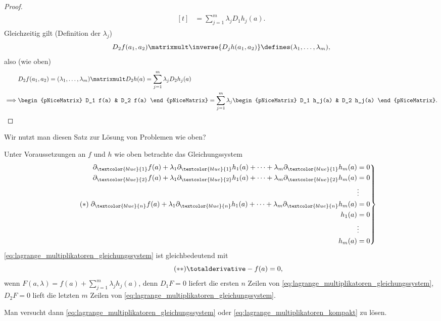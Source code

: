 \begin{proof}
\begin{align*}
\begin{aligned}[t]
      &=\sum_{j=1}^{m}\lambda_j D_1 h_j(a).
    \end{aligned}
  \end{align*}
  Gleichzeitig gilt (Definition der \( \lambda_j \))
  \begin{equation}
    D_2 f(a_1,a_2)\matrixmult\inverse{D_j h(a_1,a_2)}\defines (\lambda_1,\dotsc,\lambda_m),
  \end{equation}
  also (wie oben)
  \begin{align*}
    &D_2 f(a_1,a_2)=(\lambda_1,\dotsc,\lambda_m)\matrixmult D_2h(a)=\sum_{j=1}^{m}\lambda_j D_2 h_j(a)\\
    \implies &\begin{pNiceMatrix} D_1 f(a) & D_2 f(a) \end{pNiceMatrix}= \sum_{j=1}^{m} \lambda_j \begin{pNiceMatrix} D_1 h_j(a) & D_2 h_j(a) \end{pNiceMatrix}.
  \end{align*}
\end{proof}
Wir nutzt man diesen Satz zur Lösung von Problemen wie oben?
\begin{bemerkung}
  Unter Voraussetzungen an \( f \) und \( h \) wie oben betrachte das Gleichungssystem 
  \begin{gather}
    \tag{\( * \)}\label{eq:lagrange_multiplikatoren_gleichungssystem}\left.\begin{aligned}
      \partial_{\textcolor{blue}{1}}f(a)+\lambda_1\partial_{\textcolor{blue}{1}} h_1(a)+\dotsb+\lambda_m \partial_{\textcolor{blue}{1}} h_m(a)&=0\\
      \partial_{\textcolor{blue}{2}}f(a)+\lambda_1\partial_{\textcolor{blue}{2}} h_1(a)+\dotsb+\lambda_m \partial_{\textcolor{blue}{2}} h_m(a)&=0\\
      &\vdots\\
      \partial_{\textcolor{blue}{n}}f(a)+\lambda_1\partial_{\textcolor{blue}{n}} h_1(a)+\dotsb+\lambda_m \partial_{\textcolor{blue}{n}} h_m(a)&=0\\
      h_1(a)&=0\\
      &\vdots\\
      h_m(a)&=0
    \end{aligned}\right\}
  \end{gather}
  \eqref{eq:lagrange_multiplikatoren_gleichungssystem} ist gleichbedeutend mit
  \begin{equation*}
    \tag{\( ** \)} \label{eq:lagrange_multiplikatoren_kompakt}\totalderivative-{f}(a)=0,
  \end{equation*}
  wenn \( F(a,\lambda)=f(a)+\sum_{j=1}^{m}\lambda_j h_j(a) \), denn \( D_1 F=0 \) liefert die ersten \( n \) Zeilen von \eqref{eq:lagrange_multiplikatoren_gleichungssystem}, \( D_2 F=0 \) lieft die letzten \( m \) Zeilen von \eqref{eq:lagrange_multiplikatoren_gleichungssystem}.

  Man versucht dann \eqref{eq:lagrange_multiplikatoren_gleichungssystem} oder \eqref{eq:lagrange_multiplikatoren_kompakt} zu lösen.
\end{bemerkung}
